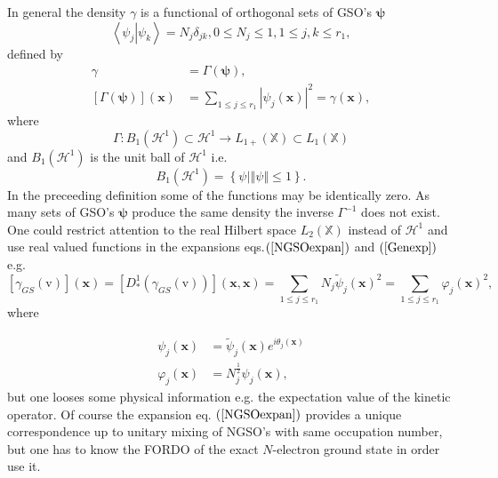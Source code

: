 \documentclass[aps,preprint]{revtex4}%
\begin{document}
In general the density $\gamma$ is a functional of orthogonal sets of GSO's
$\mathbf{\psi}$
\begin{equation}
\left\langle \left.  \psi_{j}\right\vert \psi_{k}\right\rangle =N_{j}%
\delta_{jk},0\leq N_{j}\leq1,1\leq j,k\leq r_{1},
\end{equation}
defined by%
\begin{align}
\gamma &  =\Gamma\left(  \mathbf{\psi}\right)  ,\nonumber\\
\left[  \Gamma\left(  \mathbf{\psi}\right)  \right]  \left(  \mathbf{x}%
\right)   &  =\sum_{1\leq j\leq r_{1}}\left\vert \psi_{j}\left(
\mathbf{x}\right)  \right\vert ^{2}=\gamma\left(  \mathbf{x}\right)  ,
\end{align}
where
\begin{equation}
\Gamma:B_{1}\left(  \mathcal{H}^{1}\right)  \subset\mathcal{H}^{1}\rightarrow
L_{1+}\left(  \mathbb{X}\right)  \subset L_{1}\left(  \mathbb{X}\right)
\end{equation}
and $B_{1}\left(  \mathcal{H}^{1}\right)  $ is the unit ball of $\mathcal{H}%
^{1}$ i.e.
\begin{equation}
B_{1}\left(  \mathcal{H}^{1}\right)  =\left\{  \left.  \psi\right\vert
\left\Vert \psi\right\Vert \leq1\right\}  .
\end{equation}
In the preceeding definition some of the functions may be identically zero. As
many sets of GSO's $\mathbf{\psi}$ produce the same density the inverse
$\Gamma^{-1}$ does not exist. One could restrict attention to the real Hilbert
space $L_{2}\left(  \mathbb{X}\right)  $ instead of $\mathcal{H}^{1}$ and use
real valued functions in the expansions eqs.$\left(  \ref{NGSOexpan}\right)  $
and $\left(  \ref{Genexp}\right)  $ e.g.
\begin{equation}
\left[  \gamma_{GS}\left(  \mathrm{v}\right)  \right]  \left(  \mathbf{x}%
\right)  =\left[  D_{\ast}^{1}\left(  \gamma_{GS}\left(  \mathrm{v}\right)
\right)  \right]  \left(  \mathbf{x,x}\right)  =\sum_{1\leq j\leq r_{1}}%
N_{j}\tilde{\psi}_{j}\left(  \mathbf{x}\right)  ^{2}=\sum_{1\leq j\leq r_{1}%
}\varphi_{j}\left(  \mathbf{x}\right)  ^{2},
\end{equation}
where %

\begin{align}
\psi_{j}\left(  \mathbf{x}\right)    & =\tilde{\psi}_{j}\left(  \mathbf{x}%
\right)  e^{i\theta_{j}\left(  \mathbf{x}\right)  }\nonumber\\
\varphi_{j}\left(  \mathbf{x}\right)    & =N_{j}^{\frac{1}{2}}\psi_{j}\left(
\mathbf{x}\right)  ,
\end{align}
but one looses some physical information e.g. the expectation value of the
kinetic operator. Of course the expansion eq. $\left(  \ref{NGSOexpan}\right)
$ provides a unique correspondence up to unitary mixing of NGSO's with same
occupation number, but one has to know the FORDO of the exact $N$-electron
ground state in order use it.
\end{document}
